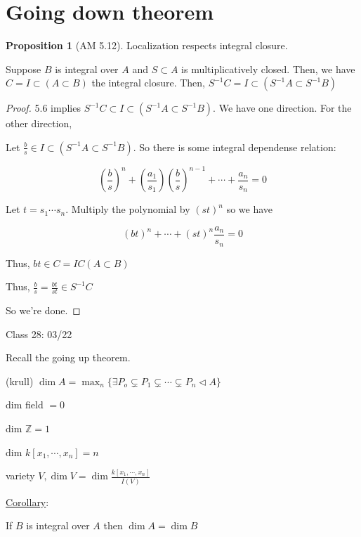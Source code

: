 \documentclass{article}
\theoremstyle{definition}
\newtheorem{proposition}{Proposition}
\begin{document}
\section*{Going down theorem}

\begin{proposition}
    [AM 5.12]

    Localization respects integral closure.

    Suppose \(B\) is integral over \(A\) and \(S \subset A\) is multiplicatively closed. Then, we have \(C = I \subset (A \subset B)\) the integral closure. Then, \(S ^{-1} C = I \subset (S ^{-1} A \subset S ^{-1} B)\) 
\end{proposition}

\begin{proof}
    5.6 implies \(S ^{-1} C \subset I \subset (S ^{-1} A \subset S ^{-1} B)\). We have one direction. For the other direction,
    
    Let \(\frac{b}{s} \in I \subset (S ^{-1} A \subset S ^{-1}  B)\). So there is some integral dependense relation:
    
    \[
        \left( \frac{b}{s} \right)^n + \left( \frac{a_1}{s_1} \right) \left( \frac{b}{s} \right)^{n - 1} + \cdots + \frac{a_n}{s_n} = 0   
    \]

    Let \(t = s_1 \cdots s_n\). Multiply the polynomial by \((st)^n\) so we have
    
    \[
        (bt)^n + \cdots + (st)^n \frac{a_n}{s_n} = 0
    \]

    Thus, \(bt\in C = IC(A \subset B)\)
    
    Thus, \(\frac{b}{s} = \frac{bt}{st} \in S^{-1} C\) 

    So we're done.
\end{proof}

\hrulefill

Class 28: 03/22

Recall the going up theorem.

(krull) \(\dim A = \max_n \{ \exists P_o \subsetneq P_1 \subsetneq \cdots \subsetneq P_n \triangleleft A \} \) 

dim field \(=0\) 

dim \(\mathbb{Z} = 1\)

dim \(k[x_1,\cdots, x_n] = n\) 

variety \(V, \dim V = \dim \frac{k[x_1,\cdots,x_n]}{I(V)}\) 

\underline{Corollary}:

If \(B\) is integral over \(A\) then \(\dim A = \dim B\)
\end{document}
